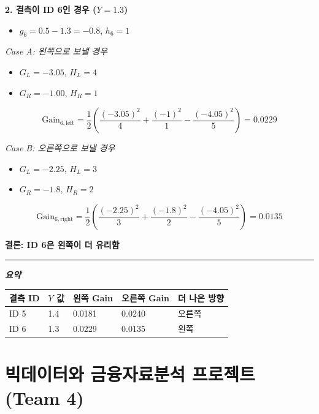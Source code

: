 \documentclass[
  a4paper,
  DIV=11,
  numbers=noendperiod]{scrreprt}
\providecommand{\tightlist}{%
  \setlength{\itemsep}{0pt}\setlength{\parskip}{0pt}}\usepackage{longtable,booktabs,array}
\begin{document}
\textbf{2. 결측이 ID 6인 경우 (\(Y = 1.3\))}

\begin{itemize}
\tightlist
\item
  \(g_6 = 0.5 - 1.3 = -0.8\), \(h_6 = 1\)
\end{itemize}

\emph{Case A: 왼쪽으로 보낼 경우}

\begin{itemize}
\tightlist
\item
  \(G_L = -3.05\), \(H_L = 4\)
\item
  \(G_R = -1.00\), \(H_R = 1\)
\end{itemize}

\[
\text{Gain}_{6,\text{left}} = \frac{1}{2} \left( \frac{(-3.05)^2}{4} + \frac{(-1)^2}{1} - \frac{(-4.05)^2}{5} \right) = 0.0229
\]

\emph{Case B: 오른쪽으로 보낼 경우}

\begin{itemize}
\tightlist
\item
  \(G_L = -2.25\), \(H_L = 3\)
\item
  \(G_R = -1.8\), \(H_R = 2\)
\end{itemize}

\[
\text{Gain}_{6,\text{right}} = \frac{1}{2} \left( \frac{(-2.25)^2}{3} + \frac{(-1.8)^2}{2} - \frac{(-4.05)^2}{5} \right) = 0.0135
\]

\textbf{결론: ID 6은 왼쪽이 더 유리함}

\begin{center}\rule{0.5\linewidth}{0.5pt}\end{center}

\textbf{\emph{요약}}

\begin{longtable}[]{@{}lllll@{}}
\toprule\noalign{}
결측 ID & \(Y\) 값 & 왼쪽 Gain & 오른쪽 Gain & 더 나은 방향 \\
\midrule\noalign{}
\endhead
\bottomrule\noalign{}
\endlastfoot
ID 5 & 1.4 & 0.0181 & 0.0240 & 오른쪽 \\
ID 6 & 1.3 & 0.0229 & 0.0135 & 왼쪽 \\
\end{longtable}

\chapter*{빅데이터와 금융자료분석 프로젝트 (Team
4)}\label{uxbe45uxb370uxc774uxd130uxc640-uxae08uxc735uxc790uxb8ccuxbd84uxc11d-uxd504uxb85cuxc81duxd2b8-team-4}
\end{document}
